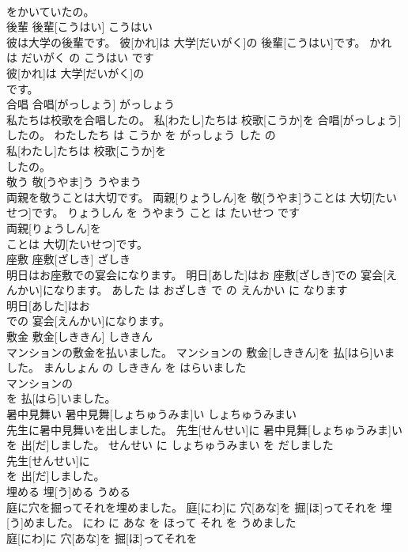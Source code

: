 \documentclass[8pt]{extreport}
\begin{document}
\begin{CJK}{UTF8}{min}
\\	をかいていたの。			
\\	後輩	後輩[こうはい]	こうはい	
\\	彼は大学の後輩です。	彼[かれ]は 大学[だいがく]の 後輩[こうはい]です。	かれ は だいがく の こうはい です	
\\	彼[かれ]は 大学[だいがく]の
\\	です。			
\\	合唱	合唱[がっしょう]	がっしょう	
\\	私たちは校歌を合唱したの。	私[わたし]たちは 校歌[こうか]を 合唱[がっしょう]したの。	わたしたち は こうか を がっしょう した の	
\\	私[わたし]たちは 校歌[こうか]を
\\	したの。			
\\	敬う	敬[うやま]う	うやまう	
\\	両親を敬うことは大切です。	両親[りょうしん]を 敬[うやま]うことは 大切[たいせつ]です。	りょうしん を うやまう こと は たいせつ です	
\\	両親[りょうしん]を
\\	ことは 大切[たいせつ]です。			
\\	座敷	座敷[ざしき]	ざしき	
\\	明日はお座敷での宴会になります。	明日[あした]はお 座敷[ざしき]での 宴会[えんかい]になります。	あした は おざしき で の えんかい に なります	
\\	明日[あした]はお
\\	での 宴会[えんかい]になります。			
\\	敷金	敷金[しききん]	しききん	
\\	マンションの敷金を払いました。	マンションの 敷金[しききん]を 払[はら]いました。	まんしょん の しききん を はらいました	
\\	マンションの
\\	を 払[はら]いました。			
\\	暑中見舞い	暑中見舞[しょちゅうみま]い	しょちゅうみまい	
\\	先生に暑中見舞いを出しました。	先生[せんせい]に 暑中見舞[しょちゅうみま]いを 出[だ]しました。	せんせい に しょちゅうみまい を だしました	
\\	先生[せんせい]に
\\	を 出[だ]しました。			
\\	埋める	埋[う]める	うめる	
\\	庭に穴を掘ってそれを埋めました。	庭[にわ]に 穴[あな]を 掘[ほ]ってそれを 埋[う]めました。	にわ に あな を ほって それ を うめました	
\\	庭[にわ]に 穴[あな]を 掘[ほ]ってそれを

\end{CJK}
\end{document}
